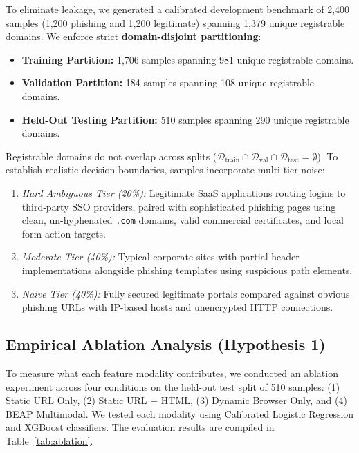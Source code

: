 \documentclass[conference]{IEEEtran}
\begin{document}
To eliminate leakage, we generated a calibrated development benchmark of 2,400 samples (1,200 phishing and 1,200 legitimate) spanning 1,379 unique registrable domains. We enforce strict \textbf{domain-disjoint partitioning}:
\begin{itemize}[leftmargin=2.5em]
    \item \textbf{Training Partition:} 1,706 samples spanning 981 unique registrable domains.
    \item \textbf{Validation Partition:} 184 samples spanning 108 unique registrable domains.
    \item \textbf{Held-Out Testing Partition:} 510 samples spanning 290 unique registrable domains.
\end{itemize}
Registrable domains do not overlap across splits ($\mathcal{D}_{\text{train}} \cap \mathcal{D}_{\text{val}} \cap \mathcal{D}_{\text{test}} = \emptyset$). To establish realistic decision boundaries, samples incorporate multi-tier noise:
\begin{enumerate}[leftmargin=2.5em]
    \item \textit{Hard Ambiguous Tier (20\%):} Legitimate SaaS applications routing logins to third-party SSO providers, paired with sophisticated phishing pages using clean, un-hyphenated \texttt{.com} domains, valid commercial certificates, and local form action targets.
    \item \textit{Moderate Tier (40\%):} Typical corporate sites with partial header implementations alongside phishing templates using suspicious path elements.
    \item \textit{Naive Tier (40\%):} Fully secured legitimate portals compared against obvious phishing URLs with IP-based hosts and unencrypted HTTP connections.
\end{enumerate}

\subsection{Empirical Ablation Analysis (Hypothesis 1)}\label{ablation-results}

To measure what each feature modality contributes, we conducted an ablation experiment across four conditions on the held-out test split of 510 samples: (1) Static URL Only, (2) Static URL + HTML, (3) Dynamic Browser Only, and (4) BEAP Multimodal. We tested each modality using Calibrated Logistic Regression and XGBoost classifiers. The evaluation results are compiled in Table~\ref{tab:ablation}.
\end{document}
